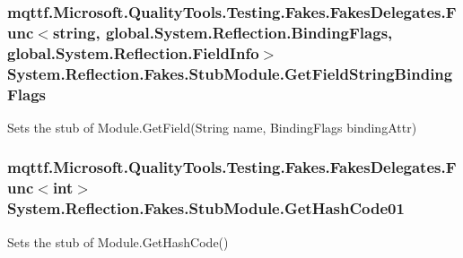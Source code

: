 \hypertarget{class_system_1_1_reflection_1_1_fakes_1_1_stub_module_ae75c1ac7aac137ae5200c21c63ff555d}{
\subsubsection[{Get\-Field\-String\-Binding\-Flags}]{\setlength{\rightskip}{0pt plus 5cm}mqttf.\-Microsoft.\-Quality\-Tools.\-Testing.\-Fakes.\-Fakes\-Delegates.\-Func$<$string, global.\-System.\-Reflection.\-Binding\-Flags, global.\-System.\-Reflection.\-Field\-Info$>$ System.\-Reflection.\-Fakes.\-Stub\-Module.\-Get\-Field\-String\-Binding\-Flags}}\label{class_system_1_1_reflection_1_1_fakes_1_1_stub_module_ae75c1ac7aac137ae5200c21c63ff555d}


Sets the stub of Module.\-Get\-Field(\-String name, Binding\-Flags binding\-Attr)

\hypertarget{class_system_1_1_reflection_1_1_fakes_1_1_stub_module_a04eb72c2b6cc7c1ae277acd2bf446a38}{
\subsubsection[{Get\-Hash\-Code01}]{\setlength{\rightskip}{0pt plus 5cm}mqttf.\-Microsoft.\-Quality\-Tools.\-Testing.\-Fakes.\-Fakes\-Delegates.\-Func$<$int$>$ System.\-Reflection.\-Fakes.\-Stub\-Module.\-Get\-Hash\-Code01}}\label{class_system_1_1_reflection_1_1_fakes_1_1_stub_module_a04eb72c2b6cc7c1ae277acd2bf446a38}


Sets the stub of Module.\-Get\-Hash\-Code()

